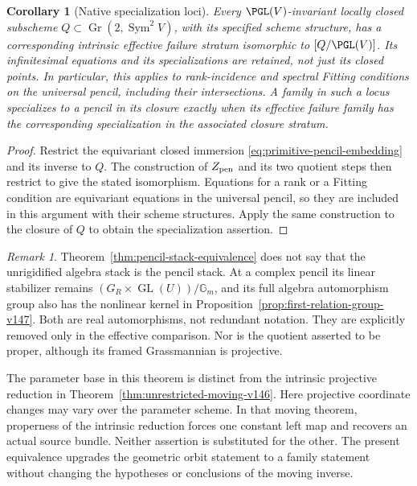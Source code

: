 \documentclass[11pt,reqno]{amsart}
\numberwithin{equation}{section}
\newtheorem{corollary}[theorem]{Corollary}
\theoremstyle{definition}\newtheorem{definition}[theorem]{Definition}
\theoremstyle{remark}\newtheorem{remark}[theorem]{Remark}
\DeclareMathOperator{\Sym}{Sym}\DeclareMathOperator{\Gr}{Gr}
\begin{document}
\begin{corollary}[Native specialization loci]\label{cor:pencil-specialization-stack}
Every \(\PGL(V)\)-invariant locally closed subscheme
\(Q\subset\Gr(2,\Sym^2V)\), with its specified scheme structure,
has a corresponding intrinsic effective failure stratum
isomorphic to \([Q/\PGL(V)]\).  Its infinitesimal equations and its
specializations are retained, not just its closed points.
In particular, this applies to rank-incidence and spectral Fitting
conditions on the universal pencil, including their intersections.
A family in such a locus specializes to a pencil in its closure
exactly when its effective failure family has the corresponding
specialization in the associated closure stratum.
\end{corollary}
\begin{proof}
Restrict the equivariant closed immersion
\eqref{eq:primitive-pencil-embedding} and its inverse to \(Q\).
The construction of \(Z_{\rm pen}\) and its two quotient steps
then restrict to give the stated isomorphism.  Equations for a
rank or a Fitting condition are equivariant equations in the
universal pencil, so they are included in this argument with their
scheme structures.  Apply the same construction to the closure of
\(Q\) to obtain the specialization assertion.
\end{proof}

\begin{remark}\label{rem:moduli-scope}
Theorem~\ref{thm:pencil-stack-equivalence} does not say that the
unrigidified algebra stack is the pencil stack.  At a complex
pencil its linear stabilizer remains
\((G_R\times\operatorname{GL}(U))/\mathbb G_m\), and its full
algebra automorphism group also has the nonlinear kernel in
Proposition~\ref{prop:first-relation-group-v147}.  Both are real
automorphisms, not redundant notation.  They are explicitly removed
only in the effective comparison.  Nor is the quotient asserted to
be proper, although its framed Grassmannian is projective.

The parameter base in this theorem is distinct from the intrinsic
projective reduction in Theorem~\ref{thm:unrestricted-moving-v146}.
Here projective coordinate changes may vary over the parameter
scheme.  In that moving theorem, properness of the intrinsic
reduction forces one constant left map and recovers an actual
source bundle.  Neither assertion is substituted for the other.
The present equivalence upgrades the geometric orbit statement to
a family statement without changing the hypotheses or conclusions
of the moving inverse.
\end{remark}
\end{document}
